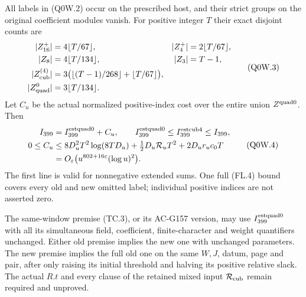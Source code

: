 \begin{theorem}
\label{AC-G161-window}
All labels in (Q0W.2) occur on the prescribed host, and their
strict groups on the original coefficient modules vanish.
For positive integer $T$ their exact disjoint counts are
\[
 \begin{aligned}
 |Z_{16}^+|&=4\lfloor T/67\rfloor,&|Z_4^+|&=2\lfloor T/67\rfloor,\\
 |Z_8|&=4\lfloor T/134\rfloor,&|Z_3|&=T-1,\\
 |Z_{\rm cub}^{(4)}|&=3\bigl(\lfloor(T-1)/268\rfloor
                                     +\lfloor T/67\rfloor\bigr),\\
 |Z_{\rm quad}^0|&=3\lfloor T/134\rfloor.
 \end{aligned}
 \tag{Q0W.3}
\]
Let $C_u$ be the actual normalized positive-index cost over the
entire union $Z^{\rm quad0}$.  Then
\[
 \begin{aligned}
 I_{399}&=I_{399}^{\rm estquad0}+C_u,\qquad
 I_{399}^{\rm estquad0}\leq I_{399}^{\rm estcub4}\leq I_{399},\\
 0\leq C_u&\leq8D_u^2T^2\log(8TD_u)
              +\tfrac12D_u\mathcal R_uT^2+2D_ur_uc_0T\\
 &=O_\varepsilon\bigl(u^{802+16\varepsilon}(\log u)^2\bigr).
 \end{aligned}
 \tag{Q0W.4}
\]
The first line is valid for nonnegative extended sums.
One full (FL.4) bound covers every old and new omitted label;
individual positive indices are not asserted zero.

The same-window premise (TC.3), or its AC-G157 version, may use
$I_{399}^{\rm estquad0}$ with all its simultaneous field,
coefficient, finite-character and weight quantifiers unchanged.
Either old premise implies the new one with unchanged parameters.
The new premise implies the full old one on the same $W,J$,
datum, page and pair, after only raising its initial threshold
and halving its positive relative slack.
The actual $R.t$ and every clause of the retained mixed input
$\mathcal R_{\rm cub}$ remain required and unproved.
\end{theorem}


